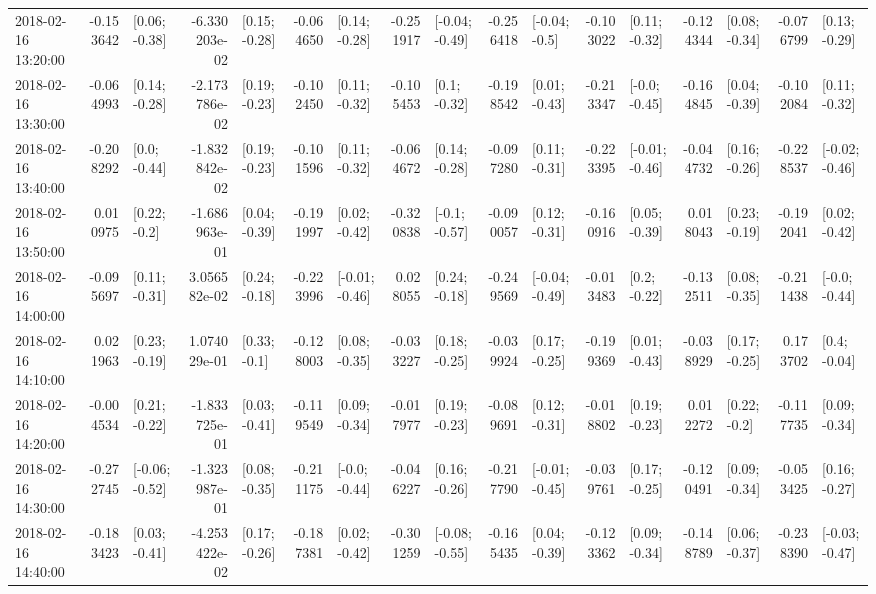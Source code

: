 \begin{tabular}{lrlrlrlrlrlrlrlrl}
2018-02-16 13:20:00 & -0.153642 &   [0.06; -0.38] & -6.330203e-02 &   [0.15; -0.28] & -0.064650 &   [0.14; -0.28] & -0.251917 &  [-0.04; -0.49] & -0.256418 &   [-0.04; -0.5] & -0.103022 &   [0.11; -0.32] & -0.124344 &   [0.08; -0.34] & -0.076799 &   [0.13; -0.29] \\
2018-02-16 13:30:00 & -0.064993 &   [0.14; -0.28] & -2.173786e-02 &   [0.19; -0.23] & -0.102450 &   [0.11; -0.32] & -0.105453 &    [0.1; -0.32] & -0.198542 &   [0.01; -0.43] & -0.213347 &   [-0.0; -0.45] & -0.164845 &   [0.04; -0.39] & -0.102084 &   [0.11; -0.32] \\
2018-02-16 13:40:00 & -0.208292 &    [0.0; -0.44] & -1.832842e-02 &   [0.19; -0.23] & -0.101596 &   [0.11; -0.32] & -0.064672 &   [0.14; -0.28] & -0.097280 &   [0.11; -0.31] & -0.223395 &  [-0.01; -0.46] & -0.044732 &   [0.16; -0.26] & -0.228537 &  [-0.02; -0.46] \\
2018-02-16 13:50:00 &  0.010975 &    [0.22; -0.2] & -1.686963e-01 &   [0.04; -0.39] & -0.191997 &   [0.02; -0.42] & -0.320838 &   [-0.1; -0.57] & -0.090057 &   [0.12; -0.31] & -0.160916 &   [0.05; -0.39] &  0.018043 &   [0.23; -0.19] & -0.192041 &   [0.02; -0.42] \\
2018-02-16 14:00:00 & -0.095697 &   [0.11; -0.31] &  3.056582e-02 &   [0.24; -0.18] & -0.223996 &  [-0.01; -0.46] &  0.028055 &   [0.24; -0.18] & -0.249569 &  [-0.04; -0.49] & -0.013483 &    [0.2; -0.22] & -0.132511 &   [0.08; -0.35] & -0.211438 &   [-0.0; -0.44] \\
2018-02-16 14:10:00 &  0.021963 &   [0.23; -0.19] &  1.074029e-01 &    [0.33; -0.1] & -0.128003 &   [0.08; -0.35] & -0.033227 &   [0.18; -0.25] & -0.039924 &   [0.17; -0.25] & -0.199369 &   [0.01; -0.43] & -0.038929 &   [0.17; -0.25] &  0.173702 &    [0.4; -0.04] \\
2018-02-16 14:20:00 & -0.004534 &   [0.21; -0.22] & -1.833725e-01 &   [0.03; -0.41] & -0.119549 &   [0.09; -0.34] & -0.017977 &   [0.19; -0.23] & -0.089691 &   [0.12; -0.31] & -0.018802 &   [0.19; -0.23] &  0.012272 &    [0.22; -0.2] & -0.117735 &   [0.09; -0.34] \\
2018-02-16 14:30:00 & -0.272745 &  [-0.06; -0.52] & -1.323987e-01 &   [0.08; -0.35] & -0.211175 &   [-0.0; -0.44] & -0.046227 &   [0.16; -0.26] & -0.217790 &  [-0.01; -0.45] & -0.039761 &   [0.17; -0.25] & -0.120491 &   [0.09; -0.34] & -0.053425 &   [0.16; -0.27] \\
2018-02-16 14:40:00 & -0.183423 &   [0.03; -0.41] & -4.253422e-02 &   [0.17; -0.26] & -0.187381 &   [0.02; -0.42] & -0.301259 &  [-0.08; -0.55] & -0.165435 &   [0.04; -0.39] & -0.123362 &   [0.09; -0.34] & -0.148789 &   [0.06; -0.37] & -0.238390 &  [-0.03; -0.47] \\

\end{tabular}
